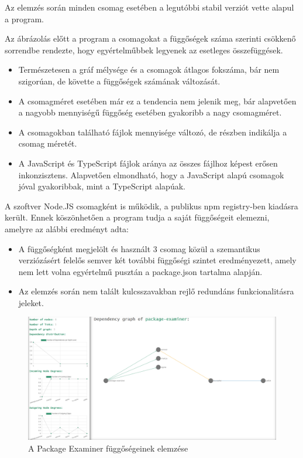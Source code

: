 \pagebreak

Az elemzés során minden csomag esetében a legutóbbi stabil verziót vette alapul a program. 

Az ábrázolás előtt a program a csomagokat a függőségek száma szerinti csökkenő sorrendbe rendezte, hogy egyértelműbbek legyenek az esetleges összefüggések.

\begin{itemize}
	\item Természetesen a gráf mélysége és a csomagok átlagos fokszáma, bár nem szigorúan, de követte a függőségek számának változását.
	\item A csomagméret esetében már ez a tendencia nem jelenik meg, bár alapvetően a nagyobb mennyiségű függőség esetében gyakoribb a nagy csomagméret.
	\item A csomagokban található fájlok mennyisége változó, de részben indikálja a csomag méretét.
	\item A JavaScript és TypeScript fájlok aránya az összes fájlhoz képest erősen inkonzisztens. Alapvetően elmondható, hogy a JavaScript alapú csomagok jóval gyakoribbak, mint a TypeScript alapúak.
\end{itemize}


A szoftver Node.JS csomagként is működik, a publikus npm registry-ben kiadásra került. Ennek köszönhetően a program tudja a saját függőségeit elemezni, amelyre az alábbi eredményt adta:

\begin{itemize}
	\item A függőségként megjelölt és használt 3 csomag közül a szemantikus verziózásért felelős semver két további függőségi szintet eredményezett, amely nem lett volna egyértelmű pusztán a package.json tartalma alapján.
	\item Az elemzés során nem talált kulcsszavakban rejlő redundáns funkcionalitásra jeleket.
\end{itemize}

\begin{figure}[!h]
	\centering
	\includegraphics[scale=0.3]{images/package-examiner.png}
	\caption{A Package Examiner függőségeinek elemzése}
	\label{fig:package-examiner}
\end{figure}